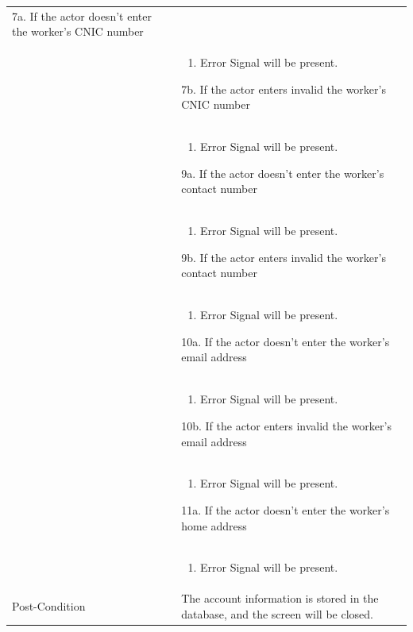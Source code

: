 \documentclass[12pt,a4paper]{article}
\begin{document}
\begin{longtable}{| p{3cm}|p{12cm}|}
7a. If the actor doesn't enter the worker's CNIC number\\ 	
&	\begin{enumerate}
		\item Error Signal will be present.
	\end{enumerate}
7b. If the actor enters invalid the worker's CNIC number\\ 	
&	\begin{enumerate}
		\item Error Signal will be present.
	\end{enumerate}
9a. If the actor doesn't enter the worker's contact number\\ 	
&	\begin{enumerate}
		\item Error Signal will be present.
	\end{enumerate}
9b. If the actor enters invalid the worker's contact number\\ 	
&	\begin{enumerate}
		\item Error Signal will be present.
	\end{enumerate}
10a. If the actor doesn't enter the worker's email address\\ 	
&	\begin{enumerate}
		\item Error Signal will be present.
	\end{enumerate}
10b. If the actor enters invalid the worker's email address\\ 	
&	\begin{enumerate}
		\item Error Signal will be present.
	\end{enumerate}
11a. If the actor doesn't enter the worker's home address\\ 	
&	\begin{enumerate}
		\item Error Signal will be present.
	\end{enumerate}
\\ \hline
Post-Condition & The account information is stored in the database, and the screen will be closed. \\\hline

\end{longtable}
\end{document}
